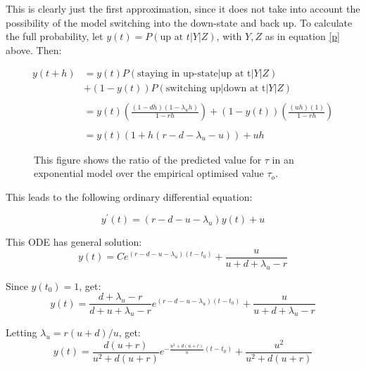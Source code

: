 \documentclass[11pt]{paper}
\begin{document}
This is clearly just the first approximation, since it does not take into account the possibility of the model switching into the down-state and back up.  To calculate the full probability, let $y(t) = P(\mbox{up at } t | Y | Z)$, with $Y,Z$ as in equation \ref{p} above.  Then:

\begin{equation}
\begin{split}
y(t+h) &=  y(t)P(\mbox{staying in up-state} | \mbox{up at t}|Y|Z)  \\
& + (1-y(t))P(\mbox{switching up} | \mbox{down at t}|Y|Z)\\
&\\
&= y(t)\left( \frac{(1-dh)(1-\lambda_uh)}{1-rh} \right) + (1-y(t)) \left(\frac{(uh)(1)}{1-rh}  \right)\\
&\\
& = y(t)\left( 1 + h(r-d-\lambda_u-u ) \right) + uh
\end{split}
\end{equation}

\begin{figure}[b!]
\begin{center}
\resizebox{0.75\textwidth}{!}{}
\caption{\label{predovertauopt} This figure shows the ratio of the predicted value for $\tau$ in an exponential model over the empirical optimised value $\tau_o$.}
\end{center}
\end{figure}

This leads to the following ordinary differential equation:

\begin{equation}
y^\prime(t) = \left( r - d - u - \lambda_u \right)y(t) + u
\end{equation}

This ODE has general solution:
\begin{equation}
y(t) = Ce^{(r-d-u-\lambda_u)(t-t_0)} + \frac{u}{u+d+\lambda_u - r}
\end{equation}

Since $y(t_0) = 1$, get:
\begin{equation}
y(t) = \frac{d+\lambda_u - r}{d+u+\lambda_u -r} e^{(r-d-u-\lambda_u)(t-t_0)} + \frac{u}{u+d+\lambda_u-r}
\end{equation}

Letting $\lambda_u = r(u+d)/u$, get:
\begin{equation}
y(t) = \frac{d(u+r)}{u^2 + d(u+r)} e^{-\frac{u^2+d(u+r)}{u}(t-t_0)} + \frac{u^2}{u^2+ d(u+r)}
\end{equation}
\end{document}
